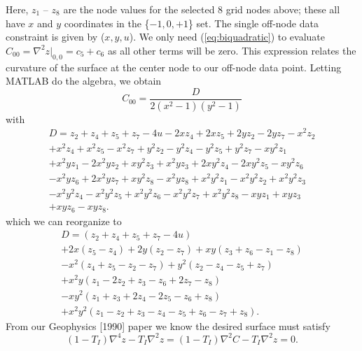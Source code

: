 \documentclass[12pt,letterpaper]{article}
\begin{document}
Here, $z_1$ -- $z_8$ are the node values for the selected 8 grid nodes above; these all have $x$ and $y$ coordinates
in the \{$-1, 0, +1$\} set.  The single off-node data constraint is given by ($x,y,u$).
We only need (\ref{eq:biquadratic}) to evaluate $C_{00} = \nabla^2 z \rvert _{0, 0} = c_5 + c_6$ as all other terms will be zero.
This expression relates the curvature of the surface at the center node to our off-node data point.  Letting MATLAB do the algebra,
we obtain
\begin{equation}
C_{00} = \frac{D}{2(x^2-1)(y^2-1)}
\label{eq:biquad}
\end{equation}
with
\begin{equation}
\begin{split}
D = z_2 + z_4 + z_5 + z_7 - 4u - 2x z_4 + 2 x z_5 + 2 y z_2 - 2 y z_7 - x^2 z_2   \\
    + x^2 z_4 + x^2 z_5 - x^2 z_7 + y^2 z_2 - y^2 z_4 - y^2 z_5 + y^2 z_7 - x y^2 z_1    \\
    + x^2 y z_1 - 2 x^2 y z_2 + x y^2 z_3 + x^2 y z_3 + 2 x y^2 z_4 - 2 x y^2 z_5 - x y^2 z_6  \\
    - x^2 y z_6 + 2 x^2 y z_7 + x y^2 z_8 - x^2 y z_8 + x^2 y^2 z_1 - x^2 y^2 z_2 + x^2 y^2 z_3   \\
    - x^2 y^2 z_4 - x^2 y^2 z_5+ x^2 y^2 z_6 - x^2 y^2 z_7 + x^2 y^2 z_8 - x y z_1 + x y z_3 \\
    + x y z_6 - x y z_8.
\end{split}
\end{equation}
which we can reorganize to
\begin{equation}
\begin{split}
D = (z_2 + z_4 + z_5 + z_7 - 4u)   \\
	+ 2x (z_5 - z_4) + 2y (z_2 - z_7) + x y (z_3 + z_6 - z_1 - z_8) \\
	- x^2 (z_4 + z_5 - z_2 - z_7) + y^2 (z_2 - z_4 - z_5 + z_7)    \\
	+ x^2 y (z_1 - 2 z_2 + z_3 - z_6 + 2 z_7 - z_8) \\
	- x y^2 (z_1 + z_3 + 2 z_4 - 2 z_5 - z_6 + z_8)  \\
	+ x^2 y^2 (z_1 - z_2 + z_3 - z_4 - z_5 + z_6 - z_7 + z_8).
\end{split}
\end{equation}
From our Geophysics [1990] paper we know the desired surface must satisfy
\begin{equation}
\left( 1 - T_I\right)\nabla^4 z - T_I \nabla^2 z = \left( 1 - T_I\right)\nabla^2 C - T_I \nabla^2 z = 0.
\label{eq:biharm}
\end{equation}
\end{document}
